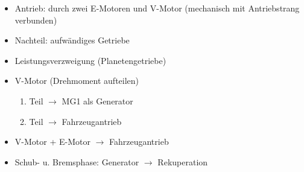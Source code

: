 \begin{enumerate}
  \begin{itemize}
  \item
    Antrieb: durch zwei E-Motoren und V-Motor (mechanisch mit
    Antriebstrang verbunden)
  \item
    Nachteil: aufwändiges Getriebe
  \item
    Leistungsverzweigung (Planetengetriebe)
  \item
    V-Motor (Drehmoment aufteilen)

    \begin{enumerate}
    \def\labelenumii{\arabic{enumii}.}
    \item
      Teil $\to$ MG1 als Generator
    \item
      Teil $\to$ Fahrzeugantrieb
    \end{enumerate}
  \item
    V-Motor + E-Motor $\to$ Fahrzeugantrieb
  \item
    Schub- u. Bremsphase: Generator $\to$ Rekuperation
  \end{itemize}
\end{enumerate}
